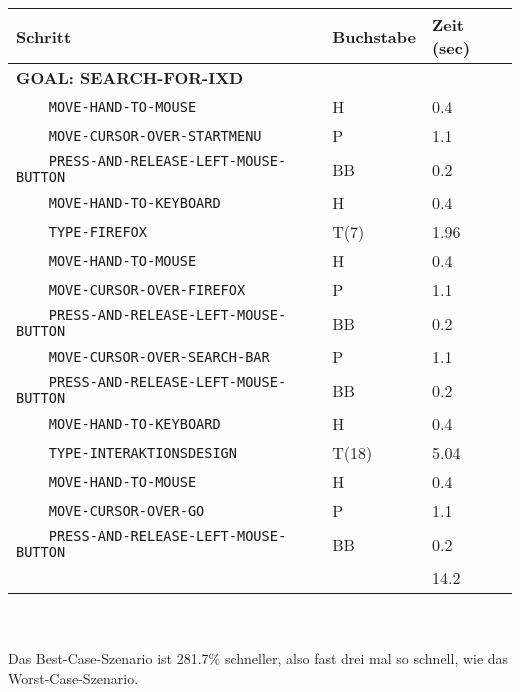 \documentclass[a4paper,10pt]{article}
\begin{document}
\begin{tabular}{l|l|l}
Schritt & Buchstabe & Zeit (sec) \\ \hline 
\textbf{GOAL: SEARCH-FOR-IXD} & & \\
\verb|    MOVE-HAND-TO-MOUSE| & H & 0.4 \\ 
\verb|    MOVE-CURSOR-OVER-STARTMENU| & P & 1.1 \\ 
\verb|    PRESS-AND-RELEASE-LEFT-MOUSE-BUTTON| & BB & 0.2 \\
\verb|    MOVE-HAND-TO-KEYBOARD| & H & 0.4 \\ 
\verb|    TYPE-FIREFOX| & T(7) & 1.96 \\
\verb|    MOVE-HAND-TO-MOUSE| & H & 0.4 \\ 
\verb|    MOVE-CURSOR-OVER-FIREFOX| & P & 1.1 \\ 
\verb|    PRESS-AND-RELEASE-LEFT-MOUSE-BUTTON| & BB & 0.2 \\
\verb|    MOVE-CURSOR-OVER-SEARCH-BAR| & P & 1.1 \\ 
\verb|    PRESS-AND-RELEASE-LEFT-MOUSE-BUTTON| & BB & 0.2 \\
\verb|    MOVE-HAND-TO-KEYBOARD| & H & 0.4 \\ 
\verb|    TYPE-INTERAKTIONSDESIGN| & T(18) & 5.04 \\ 
\verb|    MOVE-HAND-TO-MOUSE| & H & 0.4 \\ 
\verb|    MOVE-CURSOR-OVER-GO| & P & 1.1 \\ 
\verb|    PRESS-AND-RELEASE-LEFT-MOUSE-BUTTON| & BB & 0.2 \\
\hline & & 14.2
\end{tabular} 
\\ \\

Das Best-Case-Szenario ist 281.7\% schneller, also fast drei mal so schnell, wie das Worst-Case-Szenario.
\end{document}
